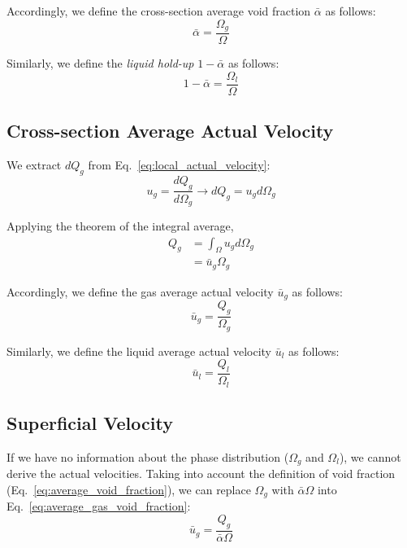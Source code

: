 Accordingly, we define the cross-section average void fraction $\bar{\alpha}$ as
follows:
\begin{equation}
    \bar{\alpha}=\frac{\Omega_g}{\Omega}
    \label{eq:average_void_fraction}
\end{equation}

Similarly, we define the \emph{liquid hold-up} $1-\bar{\alpha}$ as follows:
\begin{equation*}
    1-\bar{\alpha}=\frac{\Omega_l}{\Omega}
\end{equation*}

\subsection{Cross-section Average Actual Velocity}
We extract $dQ_g$ from Eq.~\ref{eq:local_actual_velocity}:
\begin{equation*}
    u_g = \frac{dQ_g}{d\Omega_g} \to dQ_g = u_g d\Omega_g
\end{equation*}

Applying the theorem of the integral average,
\begin{align*}
    Q_g &= \int_\Omega u_g d\Omega_g \\
    &= \bar{u}_g{\Omega_g}
\end{align*}

Accordingly, we define the gas average actual velocity $\bar{u}_g$ as follows:
\begin{equation}
    \bar{u}_g = \frac{Q_g}{\Omega_g}
    \label{eq:average_gas_void_fraction}
\end{equation}

Similarly, we define the liquid average actual velocity $\bar{u}_l$ as follows:
\begin{equation}
    \bar{u}_l = \frac{Q_l}{\Omega_l}
    \label{eq:average_liquid_void_fraction}
\end{equation}

\subsection{Superficial Velocity}
If we have no information about the phase distribution ($\Omega_g$ and
$\Omega_l$), we cannot derive the actual velocities. Taking into account the
definition of void fraction (Eq.~\ref{eq:average_void_fraction}), we can replace
$\Omega_g$ with $\bar{\alpha}{\Omega}$ into
Eq.~\ref{eq:average_gas_void_fraction}:
\begin{equation*}
    \bar{u}_g = \frac{Q_g}{\bar{\alpha}{\Omega}}
\end{equation*}


